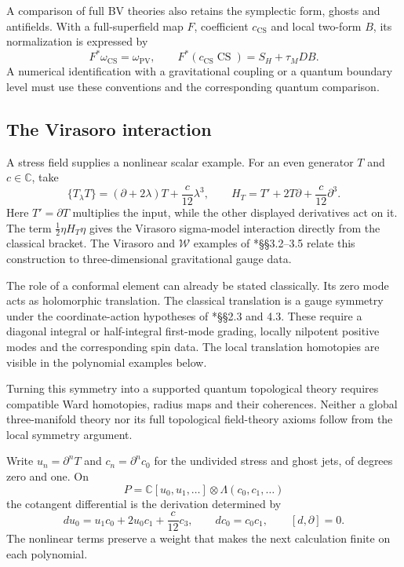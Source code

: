 A comparison of full BV theories also retains the symplectic form,
ghosts and antifields. With a full-superfield map \(F\), coefficient
\(c_{\mathrm{CS}}\) and local two-form \(B\), its normalization
is expressed by
\[
 F^*\omega_{\mathrm{CS}}=\omega_{\mathrm{PV}},\qquad
 F^*(c_{\mathrm{CS}}\operatorname{CS})=S_H+\tau_M DB.
\]
A numerical identification with a gravitational coupling or a quantum
boundary level must use these conventions and the corresponding
quantum comparison.

\subsection{The Virasoro interaction}

A stress field supplies a nonlinear scalar example.
For an even generator \(T\) and \(c\in\mathbb C\), take
\[
 \{T_\lambda T\}=(\partial+2\lambda)T+\frac c{12}\lambda^3,
 \qquad
 H_T=T'+2T\partial+\frac c{12}\partial^3.
\]
Here \(T'=\partial T\) multiplies the input, while the other
displayed derivatives act on it.
The term \(\tfrac12\eta H_T\eta\) gives the Virasoro sigma-model
interaction directly from the classical bracket.
The Virasoro and \(\mathcal W\) examples of
\cite{pcsm:KZ}*{\S\S3.2--3.5} relate this construction to
three-dimensional gravitational gauge data.

The role of a conformal element can already be stated classically.
Its zero mode acts as holomorphic translation.
The classical translation is a gauge symmetry under the
coordinate-action hypotheses of \cite{pcsm:KZ}*{\S\S2.3 and 4.3}.
These require a diagonal integral or half-integral first-mode grading,
locally nilpotent positive modes and the corresponding spin data. The local translation homotopies are visible in the
polynomial examples below.

Turning this symmetry into a supported quantum topological theory
requires compatible Ward homotopies, radius maps and their coherences.
Neither a global three-manifold theory nor its full topological
field-theory axioms follow from the local symmetry argument.

Write\label{pcsm:def:virasoro-jet-complex} \(u_n=\partial^nT\) and \(c_n=\partial^nc_0\) for the
undivided stress and ghost jets, of degrees zero and one.
On
\[
 P=\mathbb C[u_0,u_1,\ldots]\otimes\Lambda(c_0,c_1,\ldots)
\]
the cotangent differential is the derivation determined by
\[
 du_0=u_1c_0+2u_0c_1+\frac c{12}c_3,
 \qquad dc_0=c_0c_1,
 \qquad [d,\partial]=0.
\]
The nonlinear terms preserve a weight that makes the next calculation
finite on each polynomial.

